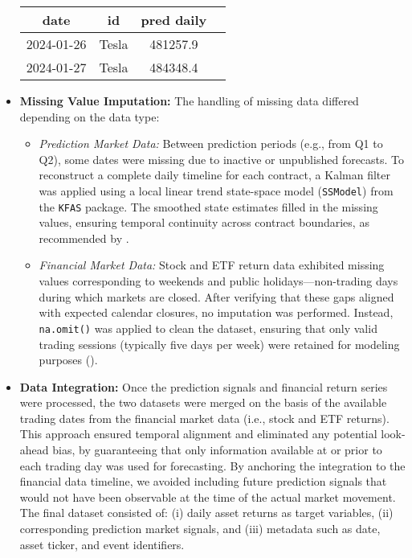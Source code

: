 \documentclass[12pt]{report}
\begin{document}
\begin{itemize}
    \vspace{10pt}  %
    \begin{center}
    \begin{tabular}{|c|c|c|c|}
    \hline
    \textbf{date} & \textbf{id} & \textbf{pred daily} \\
    \hline
    2024-01-26 & Tesla & 481257.9 \\
    2024-01-27 & Tesla & 484348.4 \\
    \hline
    \end{tabular}
    \end{center}


    \item \textbf{Missing Value Imputation:} The handling of missing data differed depending on the data type:
    \begin{itemize}
        \item \textit{Prediction Market Data:} Between prediction periods (e.g., from Q1 to Q2), some dates were missing due to inactive or unpublished forecasts. To reconstruct a complete daily timeline for each contract, a Kalman filter was applied using a local linear trend state-space model (\texttt{SSModel}) from the \texttt{KFAS} package. The smoothed state estimates filled in the missing values, ensuring temporal continuity across contract boundaries, as recommended by \cite{durbin2012time}.
        
        \item \textit{Financial Market Data:} Stock and ETF return data exhibited missing values corresponding to weekends and public holidays—non-trading days during which markets are closed. After verifying that these gaps aligned with expected calendar closures, no imputation was performed. Instead, \texttt{na.omit()} was applied to clean the dataset, ensuring that only valid trading sessions (typically five days per week) were retained for modeling purposes (\cite{brockwell2016introduction}).

    \end{itemize}

    \item \textbf{Data Integration:} Once the prediction signals and financial return series were processed, the two datasets were merged on the basis of the available trading dates from the financial market data (i.e., stock and ETF returns). This approach ensured temporal alignment and eliminated any potential look-ahead bias, by guaranteeing that only information available at or prior to each trading day was used for forecasting. By anchoring the integration to the financial data timeline, we avoided including future prediction signals that would not have been observable at the time of the actual market movement. The final dataset consisted of: (i) daily asset returns as target variables, (ii) corresponding prediction market signals, and (iii) metadata such as date, asset ticker, and event identifiers.


\end{itemize}
\end{document}
